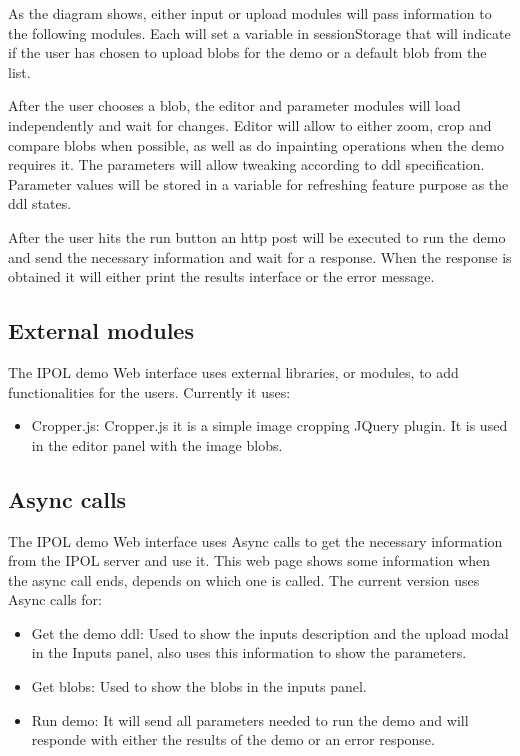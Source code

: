 As the diagram shows, either input or upload modules will pass information to the following modules. Each will set a variable in sessionStorage 
that will indicate if the user has chosen to upload blobs for the demo or a default blob from the list. 

After the user chooses a blob, the editor and parameter modules will load independently and wait for changes. Editor will allow to either 
zoom, crop and compare blobs when possible, as well as do inpainting operations when the demo requires it. The parameters will allow  
tweaking according to ddl specification. Parameter values will be stored in a variable for refreshing feature purpose as the ddl states. 

After the user hits the run button an http post will be executed to run the demo and send the necessary information and wait for a response. 
When the response is obtained it will either print the results interface or the error message.


\subsection{External modules}

The IPOL demo Web interface uses external libraries, or modules, to add functionalities for the users.
Currently it uses:

\begin{itemize}
\item Cropper.js: Cropper.js it is a simple image cropping JQuery plugin. It is used in the editor panel with the image blobs.
\end{itemize}


\subsection{Async calls}
The IPOL demo Web interface uses Async calls to get the necessary information from the IPOL server and use it.
This web page shows some information when the async call ends, depends on which one is called.
The current version uses Async calls for:
\begin{itemize}
\item Get the demo ddl: Used to show the inputs description and the upload modal in the Inputs panel, also uses this information to show the parameters.
\item Get blobs: Used to show the blobs in the inputs panel.
\item Run demo: It will send all parameters needed to run the demo and will responde with either the results of the demo or an error response.
\end{itemize}

